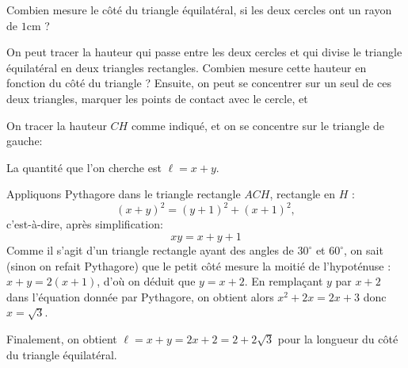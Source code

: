 
\begin{exo}
Combien mesure le côté du triangle équilatéral, si les deux cercles ont un rayon de $1$cm ?
\begin{center}
\end{center}
\begin{hint}
On peut tracer la hauteur qui passe entre les deux cercles et qui divise le triangle équilatéral en deux triangles rectangles. Combien mesure cette hauteur en fonction du côté du triangle ?
Ensuite, on peut se concentrer sur un seul de ces deux triangles, marquer les points de contact avec le cercle, et 
\end{hint}
\begin{sol}
On tracer la hauteur $CH$ comme indiqué, et on se concentre sur le triangle de gauche:
\begin{center}
\end{center}
La quantité que l'on cherche est $\ell = x+y$.



Appliquons Pythagore dans le triangle rectangle $ACH$, rectangle en $H$ : 
\[ (x+y)^2 = (y+1)^2+(x+1)^2,\]
c'est-à-dire, après simplification:
\[ xy = x+y+1\]
Comme il s'agit d'un triangle rectangle ayant des angles de $30^\circ$ et $60^\circ$, on sait (sinon on refait Pythagore) que le petit côté mesure la moitié de l'hypoténuse :
$x+y = 2(x+1)$, d'où on déduit que $y=x+2$.
En remplaçant $y$ par $x+2$ dans l'équation donnée par Pythagore, on obtient alors $x^2+2x = 2x+3$ donc $x=\sqrt{3}$.

Finalement, on obtient $\ell = x+y = 2x+2 = 2+2\sqrt 3$ pour la longueur du côté du triangle équilatéral.

\end{sol}
\end{exo}



